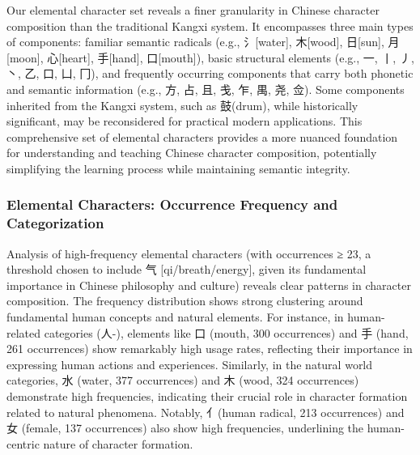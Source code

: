 \documentclass[
  11pt,
  letterpaper,
]{article}
\begin{document}
Our elemental character set reveals a finer granularity in Chinese
character composition than the traditional Kangxi system. It encompasses
three main types of components: familiar semantic radicals (e.g.,
氵{[}water{]}, 木{[}wood{]}, 日{[}sun{]}, 月{[}moon{]}, 心{[}heart{]},
手{[}hand{]}, 口{[}mouth{]}), basic structural elements (e.g., 一, 丨,
丿, 丶, 乙, 口, 凵, 冂), and frequently occurring components that carry
both phonetic and semantic information (e.g., 方, 占, 且, 戋, 乍, 禺,
尧, 佥). Some components inherited from the Kangxi system, such as
鼓(drum), while historically significant, may be reconsidered for
practical modern applications. This comprehensive set of elemental
characters provides a more nuanced foundation for understanding and
teaching Chinese character composition, potentially simplifying the
learning process while maintaining semantic integrity.

\subsubsection{Elemental Characters: Occurrence Frequency and
Categorization}\label{elemental-characters-occurrence-frequency-and-categorization}

Analysis of high-frequency elemental characters (with occurrences ≥ 23,
a threshold chosen to include 气 {[}qi/breath/energy{]}, given its
fundamental importance in Chinese philosophy and culture) reveals clear
patterns in character composition. The frequency distribution shows
strong clustering around fundamental human concepts and natural
elements. For instance, in human-related categories (人-), elements like
口 (mouth, 300 occurrences) and 手 (hand, 261 occurrences) show
remarkably high usage rates, reflecting their importance in expressing
human actions and experiences. Similarly, in the natural world
categories, 水 (water, 377 occurrences) and 木 (wood, 324 occurrences)
demonstrate high frequencies, indicating their crucial role in character
formation related to natural phenomena. Notably, 亻(human radical, 213
occurrences) and 女 (female, 137 occurrences) also show high
frequencies, underlining the human-centric nature of character
formation.
\end{document}
